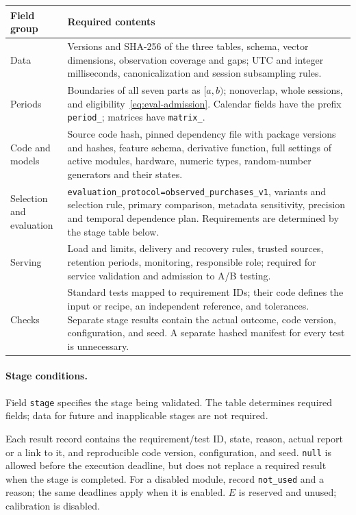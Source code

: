 \documentclass[12pt,a4paper]{article}
\newcommand{\code}[1]{{\ttfamily\small\nolinkurl{#1}}}
\theoremstyle{plainru}
\begin{document}
\begin{longtable}{L{0.24\textwidth}L{0.66\textwidth}}
\toprule Field group & Required contents \\\midrule\endhead
Data & Versions and SHA-256 of the three tables, schema, vector dimensions,
observation coverage and gaps; UTC and integer milliseconds,
canonicalization and session subsampling rules. \\
Periods & Boundaries of all seven parts as $[a,b)$; nonoverlap,
whole sessions, and eligibility~\eqref{eq:eval-admission}.
Calendar fields have the prefix \code{period_}; matrices have \code{matrix_}. \\
Code and models & Source code hash, pinned dependency file
with package versions and hashes, feature schema, derivative function,
full settings of active modules, hardware, numeric types,
random-number generators and their states. \\
Selection and evaluation & \code{evaluation_protocol=observed_purchases_v1},
variants and selection rule, primary comparison,
metadata sensitivity, precision and temporal dependence plan.
Requirements are determined by the stage table below. \\
Serving & Load and limits, delivery and recovery rules,
trusted sources, retention periods, monitoring, responsible role;
required for service validation and admission to A/B testing. \\
Checks & Standard tests mapped to requirement IDs; their code
defines the input or recipe, an independent reference, and tolerances. Separate stage
results contain the actual outcome, code version, configuration, and seed.
A separate hashed manifest for every test is unnecessary. \\
\bottomrule
\end{longtable}

\paragraph{Stage conditions.}\label{app:run-stages}
Field \code{stage} specifies the stage being validated. The table determines
required fields; data for future and inapplicable stages are not required.

Each result record contains the requirement/test ID, state,
reason, actual report or a link to it, and reproducible
code version, configuration, and seed. \code{null} is allowed before the execution deadline,
but does not replace a required result when the stage is completed.
For a disabled module, record \code{not_used} and a reason;
the same deadlines apply when it is enabled.
$E$ is reserved and unused; calibration is disabled.
\end{document}
